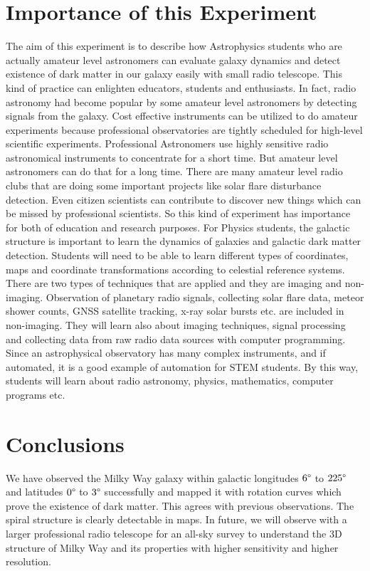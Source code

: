 \documentclass[conference]{IEEEtran}
\begin{document}
\section{Importance of this Experiment}
The aim of this experiment is to describe how Astrophysics students who are actually amateur level astronomers can evaluate galaxy dynamics and detect existence of dark matter in our galaxy easily with small radio telescope. This kind of practice can enlighten educators, students and enthusiasts. In fact, radio astronomy had become popular by some amateur level astronomers by detecting signals from the galaxy. Cost effective instruments can be utilized to do amateur experiments because professional observatories are tightly scheduled for high-level scientific experiments. Professional Astronomers use highly sensitive radio astronomical instruments to concentrate for a short time. But amateur level astronomers can do that for a long time. There are many amateur level radio clubs that are doing some important projects like solar flare disturbance detection. Even citizen scientists can contribute to discover new things which can be missed by professional scientists. So this kind of experiment has importance for both of education and research purposes. For Physics students, the galactic structure is important to learn the dynamics of galaxies and galactic dark matter detection. Students will need to be able to learn different types of coordinates, maps and coordinate transformations according to celestial reference systems. There are two types of techniques that are applied and they are imaging and non-imaging. Observation of planetary radio signals, collecting solar flare data, meteor shower counts, GNSS satellite tracking, x-ray solar bursts etc. are included in non-imaging. They will learn also about imaging techniques, signal processing and collecting data from raw radio data sources with computer programming. Since an astrophysical observatory has many complex instruments, and if automated, it is a good example of automation for STEM students. By this way, students will learn about radio astronomy, physics, mathematics, computer programs etc.



\section{Conclusions}

We have observed the Milky Way galaxy within galactic longitudes $6\degree$ to $225\degree$ and latitudes $0\degree$ to $3\degree$ successfully and mapped it with rotation curves which prove the existence of dark matter. This agrees with previous observations. The spiral structure is clearly detectable in maps. In future, we will observe with a larger professional radio telescope for an all-sky survey to understand the 3D structure of Milky Way and its properties with higher sensitivity and higher resolution.
\end{document}
